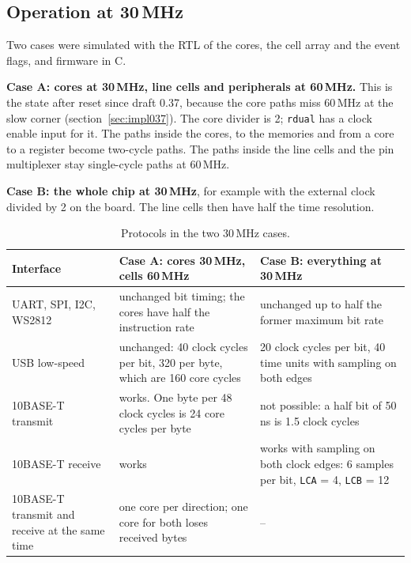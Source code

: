 \documentclass[10pt,a4paper]{article}
\newcommand{\reg}[1]{\texttt{#1}}
\begin{document}
\subsection{Operation at 30\,MHz}\label{sec:clk30}

Two cases were simulated with the RTL of the cores, the cell array and the event flags, and firmware in C.

\textbf{Case A: cores at 30\,MHz, line cells and peripherals at 60\,MHz.} This is the state after reset since draft 0.37, because the
core paths miss 60\,MHz at the slow corner (section~\ref{sec:impl037}). The core divider is 2; \texttt{rdual} has a clock enable input for it. The paths
inside the cores, to the memories and from a core to a register become two-cycle paths. The paths inside the
line cells and the pin multiplexer stay single-cycle paths at 60\,MHz.

\textbf{Case B: the whole chip at 30\,MHz}, for example with the external clock divided by 2 on the board. The
line cells then have half the time resolution.

\begin{table}[H]
\centering\small
\begin{tabularx}{\linewidth}{@{}lLL@{}}
\toprule
Interface & Case A: cores 30\,MHz, cells 60\,MHz & Case B: everything at 30\,MHz \\
\midrule
UART, SPI, I2C, WS2812 & unchanged bit timing; the cores have half the instruction rate & unchanged up to half the former maximum bit rate \\
USB low-speed & unchanged: 40 clock cycles per bit, 320 per byte, which are 160 core cycles & 20 clock cycles per bit, 40 time units with sampling on both edges \\
10BASE-T transmit & works. One byte per 48 clock cycles is 24 core cycles per byte & not possible: a half bit of 50\,ns is 1.5 clock cycles \\
10BASE-T receive & works & works with sampling on both clock edges: 6 samples per bit, \reg{LCA} = 4, \reg{LCB} = 12 \\
10BASE-T transmit and receive at the same time & one core per direction; one core for both loses received bytes & -- \\
\bottomrule
\end{tabularx}
\caption{Protocols in the two 30\,MHz cases.}
\end{table}
\end{document}
